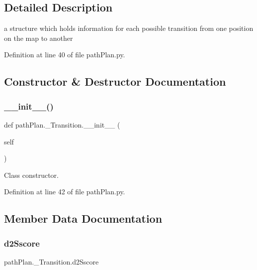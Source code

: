 \subsection{Detailed Description}
a structure which holds information for each possible transition from one position on the map to another 

Definition at line 40 of file path\+Plan.\+py.



\subsection{Constructor \& Destructor Documentation}
\mbox{\label{classpath_plan_1_1___transition_ae6a85dd74adbd4cda96fded2ba5d398e}} 
\subsubsection{\texorpdfstring{\+\_\+\+\_\+init\+\_\+\+\_\+()}{\_\_init\_\_()}}
{\footnotesize\ttfamily def path\+Plan.\+\_\+\+Transition.\+\_\+\+\_\+init\+\_\+\+\_\+ (\begin{DoxyParamCaption}\item[{}]{self }\end{DoxyParamCaption})}



Class constructor. 



Definition at line 42 of file path\+Plan.\+py.



\subsection{Member Data Documentation}
\mbox{\label{classpath_plan_1_1___transition_a03af53bb2bb866253742341b1c7b33fd}} 
\subsubsection{\texorpdfstring{d2\+Sscore}{d2Sscore}}
{\footnotesize\ttfamily path\+Plan.\+\_\+\+Transition.\+d2\+Sscore}



